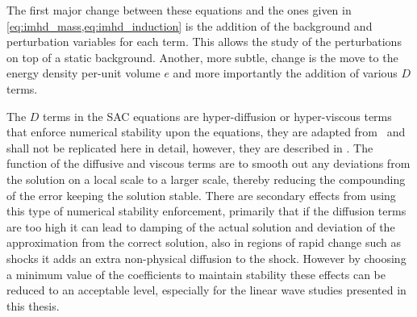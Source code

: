 The first major change between these equations and the ones given in \cref{eq:imhd_mass,eq:imhd_induction} is the addition of the background and perturbation variables for each term.
This allows the study of the perturbations on top of a static background.
Another, more subtle, change is the move to the energy density per-unit volume $e$ and more importantly the addition of various $D$ terms.

The $D$ terms in the SAC equations are hyper-diffusion or hyper-viscous terms that enforce numerical stability upon the equations, they are adapted from~\cite{nordlund1995} and shall not be replicated here in detail, however, they are described in \citet{shelyag2008}.
The function of the diffusive and viscous terms are to smooth out any deviations from the solution on a local scale to a larger scale, thereby reducing the compounding of the error keeping the solution stable.
There are secondary effects from using this type of numerical stability enforcement, primarily that if the diffusion terms are too high it can lead to damping of the actual solution and deviation of the approximation from the correct solution, also in regions of rapid change such as shocks it adds an extra non-physical diffusion to the shock.
However by choosing a minimum value of the coefficients to maintain stability these effects can be reduced to an acceptable level, especially for the linear wave studies presented in this thesis.

